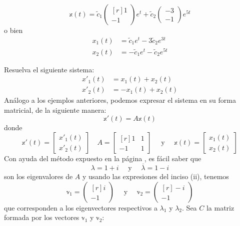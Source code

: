 \begin{example}
    $$\mathbb{x}(t) = \tilde{c}_1 \begin{pmatrix*}[r] 1 \\ -1 \end{pmatrix*} e^t + \tilde{c}_2 \begin{pmatrix*} -3 \\ -1 \end{pmatrix*} e^{5t}$$
    o bien
    \begin{align*}
        x_1(t) & = \tilde{c}_1 e^t - 3\tilde{c}_2 e^{3t} \\
        x_2(t) & = -\tilde{c}_1 e^t - \tilde{c}_2 e^{5t}
    \end{align*}
\end{example}

\begin{example}
    Resuelva el siguiente sistema:
    \begin{align*}
        x'_1(t) & = x_1(t) + x_2(t) \\
        x'_2(t) & = - x_1(t) + x_2(t)
    \end{align*}
    \solucion Análogo a los ejemplos anteriores, podemos expresar el sistema en su forma matricial, de la siguiente manera:
    $$\mathbb{x}'(t) = A\mathbb{x}(t)$$
    donde
    $$\mathbb{x}'(t) = \begin{bmatrix} x'_1(t) \\ x'_2(t) \end{bmatrix} \quad A = \begin{bmatrix*}[r] 1 & 1 \\ -1 & 1 \end{bmatrix*} \quad \text{ y } \quad \mathbb{x}(t) = \begin{bmatrix} x_1(t) \\ x_2(t) \end{bmatrix}$$
    Con ayuda del método expuesto en la página \pageref{metodo_eigen_2x2}, es fácil saber que
    $$\lambda = 1 + i \quad \text{ y } \quad \overline{\lambda} = 1 - i$$
    son los eigenvalores de $A$ y usando las expresiones del inciso (ii), tenemos
    $$\mathbb{v}_1 = \begin{pmatrix*}[r] i \\ -1 \end{pmatrix*} \quad \text{ y } \quad \mathbb{v}_2 = \begin{pmatrix*}[r] - i \\ -1 \end{pmatrix*}$$
    que corresponden a los eigenvectores respectivos a $\lambda_1$ y $\lambda_2$.
    Sea $C$ la matriz formada por los vectores $\mathbb{v}_1$ y $\mathbb{v}_2$:

\end{example}
